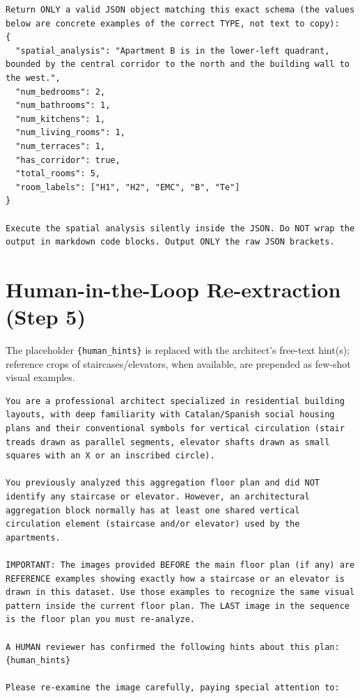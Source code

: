 \documentclass[12pt,a4paper,openright]{report}
\newcommand{\code}[1]{\texttt{#1}}
\begin{document}
\begin{appendices}
\begin{lstlisting}[style=prompt]
Return ONLY a valid JSON object matching this exact schema (the values below are concrete examples of the correct TYPE, not text to copy):
{
  "spatial_analysis": "Apartment B is in the lower-left quadrant, bounded by the central corridor to the north and the building wall to the west.",
  "num_bedrooms": 2,
  "num_bathrooms": 1,
  "num_kitchens": 1,
  "num_living_rooms": 1,
  "num_terraces": 1,
  "has_corridor": true,
  "total_rooms": 5,
  "room_labels": ["H1", "H2", "EMC", "B", "Te"]
}

Execute the spatial analysis silently inside the JSON. Do NOT wrap the output in markdown code blocks. Output ONLY the raw JSON brackets.
\end{lstlisting}

\section{Human-in-the-Loop Re-extraction (Step 5)}
\label{appendix:prompt-review}

The placeholder \code{\{human\_hints\}} is replaced with the architect's
free-text hint(s); reference crops of staircases/elevators, when available, are
prepended as few-shot visual examples.

\begin{lstlisting}[style=prompt]
You are a professional architect specialized in residential building layouts, with deep familiarity with Catalan/Spanish social housing plans and their conventional symbols for vertical circulation (stair treads drawn as parallel segments, elevator shafts drawn as small squares with an X or an inscribed circle).

You previously analyzed this aggregation floor plan and did NOT identify any staircase or elevator. However, an architectural aggregation block normally has at least one shared vertical circulation element (staircase and/or elevator) used by the apartments.

IMPORTANT: The images provided BEFORE the main floor plan (if any) are REFERENCE examples showing exactly how a staircase or an elevator is drawn in this dataset. Use those examples to recognize the same visual pattern inside the current floor plan. The LAST image in the sequence is the floor plan you must re-analyze.

A HUMAN reviewer has confirmed the following hints about this plan:
{human_hints}

Please re-examine the image carefully, paying special attention to:


\end{lstlisting}
\end{appendices}
\end{document}

